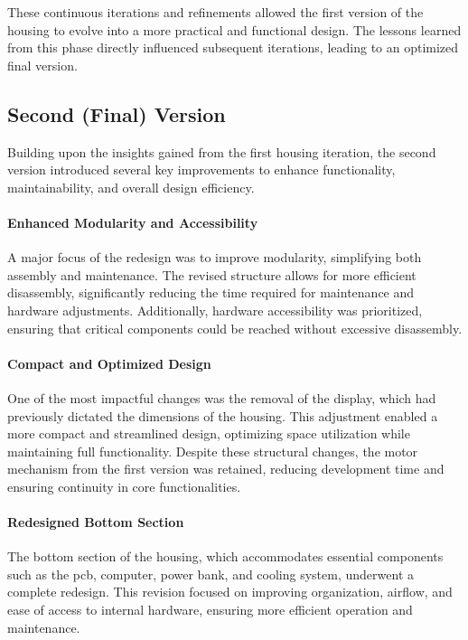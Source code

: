 These continuous iterations and refinements allowed the first version of the housing to evolve into a more practical and functional design. The lessons learned from this phase directly influenced subsequent iterations, leading to an optimized final version.  
  
  
\subsection{Second (Final) Version}
Building upon the insights gained from the first housing iteration, the second version introduced several key improvements to enhance functionality, maintainability, and overall design efficiency.  

\paragraph{Enhanced Modularity and Accessibility}  
A major focus of the redesign was to improve modularity, simplifying both assembly and maintenance. The revised structure allows for more efficient disassembly, significantly reducing the time required for maintenance and hardware adjustments. Additionally, hardware accessibility was prioritized, ensuring that critical components could be reached without excessive disassembly.  

\paragraph{Compact and Optimized Design}  
One of the most impactful changes was the removal of the display, which had previously dictated the dimensions of the housing. This adjustment enabled a more compact and streamlined design, optimizing space utilization while maintaining full functionality. Despite these structural changes, the motor mechanism from the first version was retained, reducing development time and ensuring continuity in core functionalities.  

\paragraph{Redesigned Bottom Section}  
The bottom section of the housing, which accommodates essential components such as the \acrshort{pcb}, computer, power bank, and cooling system, underwent a complete redesign. This revision focused on improving organization, airflow, and ease of access to internal hardware, ensuring more efficient operation and maintenance.  

